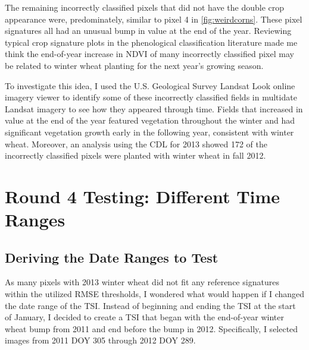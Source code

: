 The remaining incorrectly classified pixels that did not have the double crop appearance were, predominately, similar to pixel 4 in \cref{fig:weirdcorns}. These pixel signatures all had an unusual bump in value at the end of the year. Reviewing typical crop signature plots in the phenological classification literature made me think the end-of-year increase in NDVI of many incorrectly classified pixel may be related to winter wheat planting for the next year’s growing season.

To investigate this idea, I used the U.S. Geological Survey Landsat Look online imagery viewer to identify some of these incorrectly classified fields in multidate Landsat imagery to see how they appeared through time. Fields that increased in value at the end of the year featured vegetation throughout the winter and had significant vegetation growth early in the following year, consistent with winter wheat. Moreover, an analysis using the CDL for 2013 showed 172 of the incorrectly classified pixels were planted with winter wheat in fall 2012.


\section{Round 4 Testing: Different Time Ranges}
\label{appendix:testing:r4}

\subsection*{Deriving the Date Ranges to Test}

As many pixels with 2013 winter wheat did not fit any reference signatures within the utilized RMSE thresholds, I wondered what would happen if I changed the date range of the TSI. Instead of beginning and ending the TSI at the start of January, I decided to create a TSI that began with the end-of-year winter wheat bump from 2011 and end before the bump in 2012. Specifically, I selected images from 2011 DOY 305 through 2012 DOY 289.


